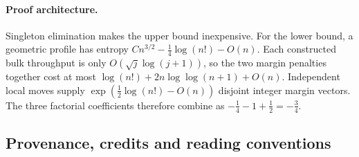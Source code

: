 \documentclass[11pt,a4paper]{article}
\theoremstyle{remark}\newtheorem{remark}[theorem]{Remark}
\numberwithin{equation}{section}
\begin{document}
\paragraph{Proof architecture.}
Singleton elimination makes the upper bound inexpensive. For the lower bound, a geometric profile has entropy
$Cn^{3/2}-\tfrac14\log(n!)-O(n)$. Each constructed bulk throughput is only $O(\sqrt j\log(j+1))$, so the two margin penalties together cost at most $\log(n!)+2n\log\log(n+1)+O(n)$. Independent local moves supply $\exp(\tfrac12\log(n!)-O(n))$ disjoint integer margin vectors. The three factorial coefficients therefore combine as
$-\tfrac14-1+\tfrac12=-\tfrac34$.

\subsection{Provenance, credits and reading conventions}\label{tes:sec:provenance}
\end{document}
